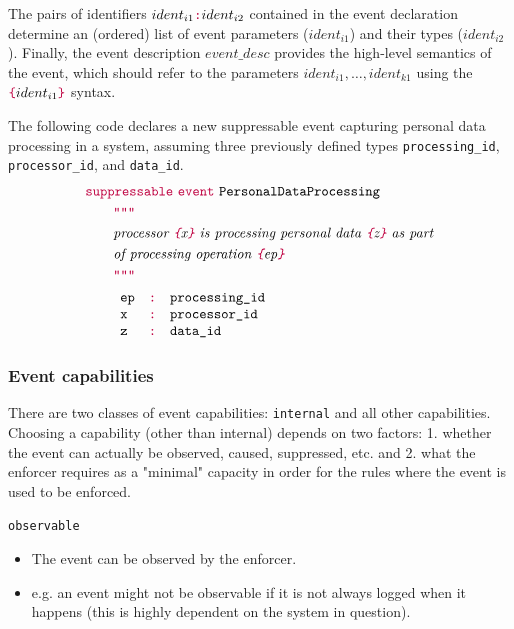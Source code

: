 \documentclass[runningheads]{llncs}
\newcommand{\kw}[1]{{\color{purple}\texttt{#1}}}
\begin{document}
The pairs of identifiers $ident_{i1}\kw{:} ident_{i2}$ contained in the event declaration determine an (ordered) list of event parameters ($ident_{i1}$) and their types ($ident_{i2}$). Finally, the event description $event\_desc$ provides the high-level semantics of the event, which should refer to the parameters $ident_{i1},\dots,ident_{k1}$ using the $\kw{\{} ident_{i1}\kw{\}}$ syntax.
\begin{example}
  The following code declares a new suppressable event capturing personal data processing in a system, assuming three previously defined types \texttt{processing\_id}, \texttt{processor\_id}, and \texttt{data\_id}.
  \begin{align*}
    &\kw{suppressable}~\kw{event}~\texttt{PersonalDataProcessing}\\
    &\qquad \kw{"""}\\
    &\qquad \text{\itshape processor \kw{\{}x\kw{\}} is processing personal data \kw{\{}z\kw{\}} as part}\\
    &\qquad \text{\itshape of processing operation \kw{\{}ep\kw{\}}}\\
    &\qquad \kw{"""}\\
    &\qquad\begin{array}{lll}
             \texttt{ep}&\kw{:}&\texttt{processing\_id}\\
             \texttt{x}&\kw{:}&\texttt{processor\_id}\\
             \texttt{z}&\kw{:}&\texttt{data\_id}
           \end{array}
  \end{align*}
\end{example}

\subsubsection{Event capabilities}
There are two classes of event capabilities: \kw{internal} and all other capabilities.
Choosing a capability (other than internal) depends on two factors:
1. whether the event can actually be observed, caused, suppressed, etc. and
2. what the enforcer requires as a "minimal" capacity in order for the rules where the event is used to be enforced.

\newpage
\kw{observable}
\begin{itemize}[*]
  \item The event can be observed by the enforcer.
  \item e.g. an event might not be observable if it is not always logged when it happens (this is highly dependent on the system in question).
\end{itemize}
\end{document}
